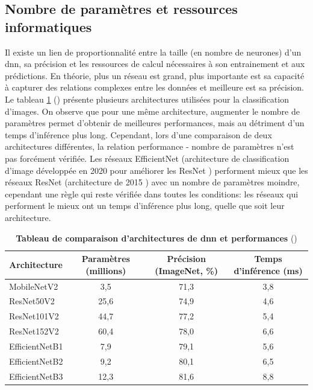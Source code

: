 \subsection{Nombre de paramètres et ressources informatiques}
Il existe un lien de proportionnalité entre la taille (en nombre de neurones) d'un \gls{dnn}, sa précision et les ressources de calcul nécessaires à son entrainement et aux prédictions. En théorie, plus un réseau est grand, plus importante est sa capacité à capturer des relations complexes entre les données et meilleure est sa précision. Le tableau \ref{table:dnn-size} (\cite{chollet_keras_2023}) présente plusieurs architectures utilisées pour la classification d'images. On observe que pour une même architecture, augmenter le nombre de paramètres permet d'obtenir de meilleures performances, mais au détriment d'un temps d'inférence plus long. Cependant, lors d'une comparaison de deux architectures différentes, la relation performance - nombre de paramètres n'est pas forcément vérifiée. Les réseaux EfficientNet (architecture de classification d'image développée en 2020 pour améliorer les ResNet \cite{tan_efficientnet_2020}) performent mieux que les réseaux ResNet (architecture de 2015 \cite{he_deep_2015}) avec un nombre de paramètres moindre, cependant une règle qui reste vérifiée dans toutes les conditions: les réseaux qui performent le mieux ont un temps d'inférence plus long, quelle que soit leur architecture.

\begin{table}[!ht]
\centering
\begin{tabular}{|l|c|c|c|} 
 \hline
 Architecture & Paramètres (millions) & Précision (ImageNet, \%) & Temps d'inférence (ms) \\
 \hline
MobileNetV2 & 3,5 & 71,3 & 3,8 \\
\hline
ResNet50V2 & 25,6 & 74,9 & 4,6 \\ 
ResNet101V2 & 44,7 & 77,2 & 5,4 \\ 
ResNet152V2 & 60,4 & 78,0 & 6,6 \\
\hline
EfficientNetB1 & 7,9 & 79,1 & 5,6 \\
EfficientNetB2 & 9,2 & 80,1& 6,5 \\
EfficientNetB3 & 12,3 & 81,6 & 8,8 \\
 \hline
\end{tabular}
\caption[Tableau de comparaison d'architectures de \gls{dnn} et performances]{\textbf{Tableau de comparaison d'architectures de \gls{dnn} et performances} (\cite{chollet_keras_2023})}
\label{table:dnn-size}
\end{table}

